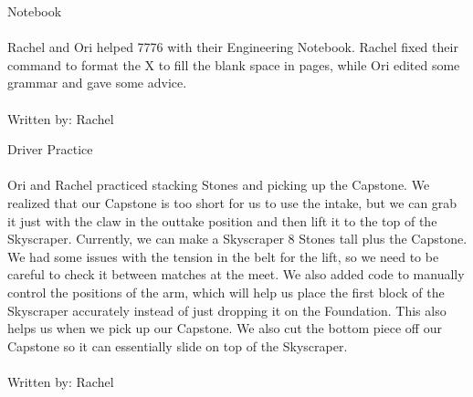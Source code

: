 {    Notebook\\\\
    Rachel and Ori helped 7776 with their Engineering Notebook. Rachel fixed their command to format the X to fill the blank space in pages, while Ori edited some grammar and gave some advice.\\\\
    Written by: Rachel
    \newBox
    
    Driver Practice\\\\
    Ori and Rachel practiced stacking Stones and picking up the Capstone. We realized that our Capstone is too short for us to use the intake, but we can grab it just with the claw in the outtake position and then lift it to the top of the Skyscraper. Currently, we can make a Skyscraper 8 Stones tall plus the Capstone. We had some issues with the tension in the belt for the lift, so we need to be careful to check it between matches at the meet. We also added code to manually control the positions of the arm, which will help us place the first block of the Skyscraper accurately instead of just dropping it on the Foundation. This also helps us when we pick up our Capstone. We also cut the bottom piece off our Capstone so it can essentially slide on top of the Skyscraper.\\\\
    Written by: Rachel
}



